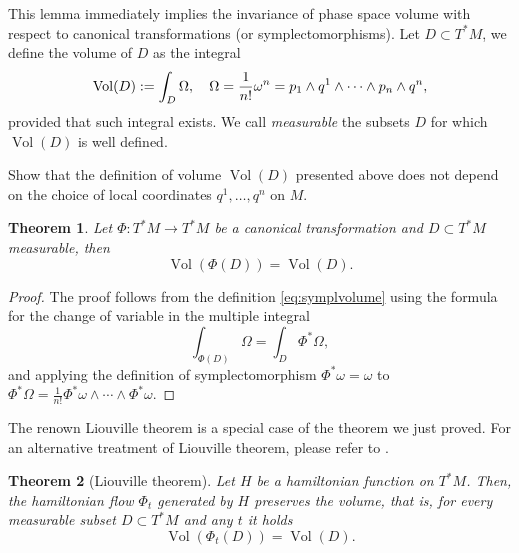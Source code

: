 \documentclass[english,fontsize=11pt,paper=a5,oneside]{scrbook}
\let\d\relax
\DeclareMathOperator{\d}{d}
\DeclareMathOperator{\Vol}{Vol}
\newtheorem{theorem}{Theorem}[chapter]
\theoremstyle{definition}
\newenvironment{exercise}
  {\pushQED{\qed}\renewcommand{\qedsymbol}{$\maltese$}\exercisex}
  {\popQED\endexercisex}
\begin{document}
This lemma immediately implies the invariance of phase space volume with respect to canonical transformations (or symplectomorphisms).
Let $D\subset T^*M$, we define the volume of $D$ as the integral
\begin{equation}\label{eq:symplvolume}
    \Vol(D) :=\int_D \Omega, \quad \Omega = \frac1{n!} \omega^n = \d p_1 \wedge \d q^1 \wedge \cdots \wedge \d p_n \wedge \d q^n,
\end{equation}
provided that such integral exists.
We call \emph{measurable} the subsets $D$ for which $\Vol(D)$ is well defined.

\begin{exercise}
    Show that the definition of volume $\Vol(D)$ presented above does not depend on the choice of local coordinates $q^1, \ldots, q^n$ on $M$.
\end{exercise}

\begin{theorem}\label{thm:liouville}
    Let $\Phi:T^*M \to T^*M$ be a canonical transformation and $D\subset T^*M$ measurable, then
    \begin{equation}
        \Vol(\Phi(D)) = \Vol(D).
    \end{equation}
\end{theorem}
\begin{proof}
    The proof follows from the definition \eqref{eq:symplvolume} using the formula for the change of variable in the multiple integral
    \begin{equation}
        \int_{\Phi(D)}\Omega = \int_D \Phi^*\Omega,
    \end{equation}
    and applying the definition of symplectomorphism $\Phi^* \omega = \omega$ to $\Phi^* \Omega = \frac1{n!}\Phi^*\omega\wedge\cdots\wedge\Phi^*\omega$. 
\end{proof}

The renown Liouville theorem is a special case of the theorem we just proved.
For an alternative treatment of Liouville theorem, please refer to \cite[Chapter 3.16]{book:arnold}.

\begin{theorem}[Liouville theorem]
    Let $H$ be a hamiltonian function on $T^*M$.
    Then, the hamiltonian flow $\Phi_t$ generated by $H$ preserves the volume, that is, for every measurable subset $D\subset T^*M$ and any $t$ it holds
    \begin{equation}
        \Vol(\Phi_t(D)) = \Vol(D).
    \end{equation}
\end{theorem}
\end{document}
